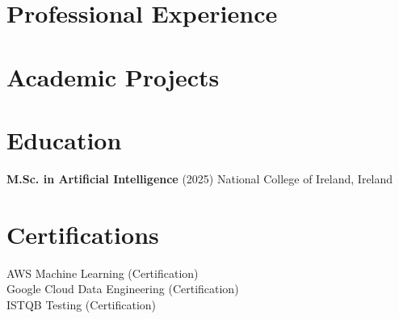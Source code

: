 \documentclass[11pt,a4paper]{article}
\begin{document}
\section{Professional Experience}


\section{Academic Projects}


\section{Education}
\textbf{M.Sc. in Artificial Intelligence} (2025) \hfill National College of Ireland, Ireland\\

\section{Certifications}
AWS Machine Learning (Certification) \\
Google Cloud Data Engineering (Certification) \\
ISTQB Testing (Certification) \\
\end{document}
